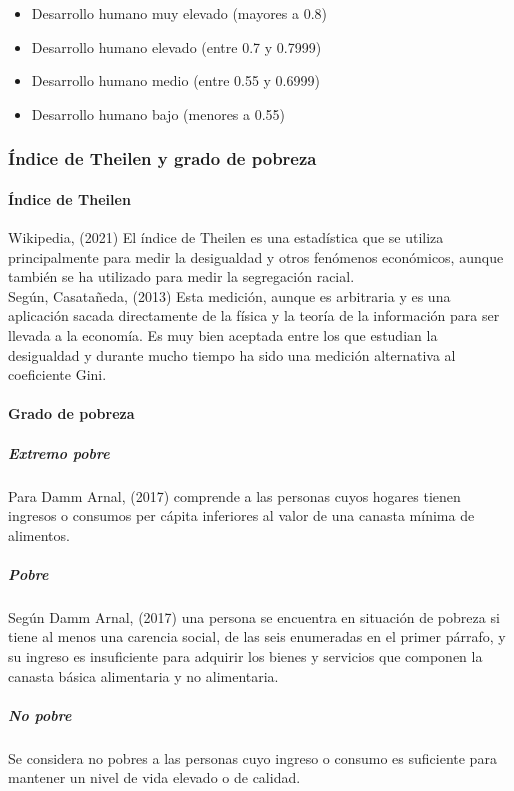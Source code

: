 \begin{itemize}
\item Desarrollo humano muy elevado (mayores a 0.8)
\item Desarrollo humano elevado (entre 0.7 y 0.7999)
\item Desarrollo humano medio (entre 0.55 y 0.6999)
\item Desarrollo humano bajo (menores a 0.55)

\end{itemize}

  \subsubsection{Índice de Theilen y grado de pobreza}

    \paragraph{Índice de Theilen}
Wikipedia, (2021) El índice de Theilen es una estadística que se utiliza principalmente para medir la desigualdad y otros fenómenos económicos, aunque también se ha utilizado para medir la segregación racial. \\
Según, Casatañeda, (2013) Esta medición, aunque es arbitraria y es una aplicación sacada directamente de la física y la teoría de la información para ser llevada a la economía. Es muy bien aceptada entre los que estudian la desigualdad y durante mucho tiempo ha sido una medición alternativa al coeficiente Gini.

    \paragraph{Grado de pobreza}

  \subparagraph{Extremo pobre}

Para Damm Arnal, (2017) comprende a las personas cuyos hogares tienen ingresos o consumos per cápita inferiores al valor de una canasta mínima de alimentos.

\subparagraph{Pobre}

Según Damm Arnal, (2017) una persona se encuentra en situación de pobreza si tiene al menos una carencia social, de las seis enumeradas en el primer párrafo, y su ingreso es insuficiente para adquirir los bienes y servicios que componen la canasta básica alimentaria y no alimentaria.

  \subparagraph{No pobre}

Se considera no pobres a las personas cuyo ingreso o consumo es suficiente para mantener un nivel de vida elevado o de calidad.

